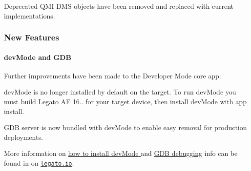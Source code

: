 Deprecated Q\+MI D\+MS objects have been removed and replaced with current implementations.\hypertarget{releaseNotes16104_rn16_10_4_Features}{}\subsubsection{New Features}\label{releaseNotes16104_rn16_10_4_Features}
\hypertarget{releaseNotes16104_rn16_10_4_devModeGDB}{}\paragraph{dev\+Mode and G\+DB}\label{releaseNotes16104_rn16_10_4_devModeGDB}
Further improvements have been made to the Developer Mode core app\+:
\begin{DoxyItemize}
\item {\ttfamily dev\+Mode} is no longer installed by default on the target. To run {\ttfamily dev\+Mode} you must build Legato AF 16.. for your target device, then install {\ttfamily dev\+Mode} with {\ttfamily app} {\ttfamily install}.
\item G\+DB server is now bundled with {\ttfamily dev\+Mode} to enable easy removal for production deployments.
\end{DoxyItemize}

More information on \hyperlink{basicTargetDevMode}{how to install {\ttfamily dev\+Mode} }and \hyperlink{howToDebugGDB}{G\+DB debugging} info can be found in on \href{https://legato.io}{\tt legato.\+io}.

